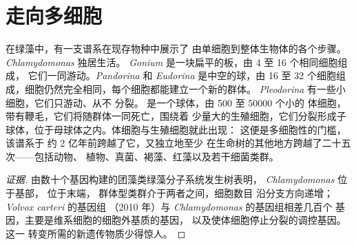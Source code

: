 \section{走向多细胞}

\begin{proposition}[团藻系列]\label{prop:b2:unicellular-diversity:volvox}
在绿藻中，有一支谱系在现存物种中展示了
由单细胞到整体生物体的各个步骤。\emph{Chlamydomonas} 独居生活。
\emph{Gonium} 是一块扁平的板，由 4 至 16 个相同细胞组成，
它们一同游动。\emph{Pandorina} 和 \emph{Eudorina} 是中空的球，由 16
至 32 个细胞组成，细胞仍然完全相同，每个细胞都能建立一个新的群体。
\emph{Pleodorina} 有一些小细胞，它们只游动、从不
分裂。 是一个球体，由 \num{500} 至 \num{50000} 个小的
体细胞，带有鞭毛，它们将随群体一同死亡，围绕着
少量大的生殖细胞，它们分裂形成子
球体，位于母球体之内。体细胞与生殖细胞就此出现：
这便是多细胞性的门槛，该谱系于
约 2 亿年前跨越了它，又独立地至少
在生命树的其他地方跨越了二十五次——包括动物、
植物、真菌、褐藻、红藻以及若干细菌类群。
\end{proposition}
\begin{proof}[证据]
由数十个基因构建的团藻类绿藻分子系统发生树表明，
\emph{Chlamydomonas} 位于基部， 位于末端，
群体型类群介于两者之间，细胞数目
沿分支方向递增；\emph{Volvox carteri} 的基因组
（2010 年）与 \emph{Chlamydomonas} 的基因组相差几百个
基因，主要是维系细胞的细胞外基质的基因，
以及使体细胞停止分裂的调控基因。这一
转变所需的新遗传物质少得惊人。
\end{proof}

